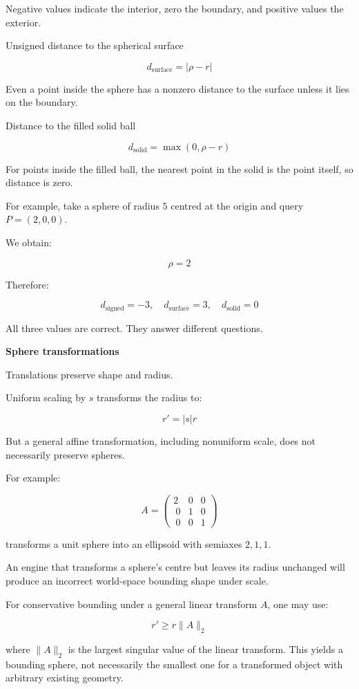 Negative values indicate the interior, zero the boundary, and positive values the exterior.

Unsigned distance to the spherical surface

\[
\boxed{d_{\mathrm{surface}}=|\rho-r|}
\]

Even a point inside the sphere has a nonzero distance to the surface unless it lies on the boundary.

Distance to the filled solid ball

\[
\boxed{d_{\mathrm{solid}}=\max(0,\rho-r)}
\]

For points inside the filled ball, the nearest point in the solid is the point itself, so distance is zero.

For example, take a sphere of radius \(5\) centred at the origin and query \(P=(2,0,0)\).

We obtain:

\[
\rho=2
\]

Therefore:

\[
d_{\mathrm{signed}}=-3,\quad d_{\mathrm{surface}}=3,\quad d_{\mathrm{solid}}=0
\]

All three values are correct. They answer different questions.

\textbf{Sphere transformations}

Translations preserve shape and radius.

Uniform scaling by \(s\) transforms the radius to:

\[
r'=|s|r
\]

But a general affine transformation, including nonuniform scale, does not necessarily preserve spheres.

For example:

\[
A= \begin{pmatrix} 2&0&0\\\ 0&1&0\\\ 0&0&1 \end{pmatrix}
\]

transforms a unit sphere into an ellipsoid with semiaxes \(2,1,1\).

An engine that transforms a sphere's centre but leaves its radius unchanged will produce an incorrect world-space bounding shape under scale.

For conservative bounding under a general linear transform \(A\), one may use:

\[
r'\ge r\|A\|_2
\]

where \(\|A\|_2\) is the largest singular value of the linear transform. This yields a bounding sphere, not necessarily the smallest one for a transformed object with arbitrary existing geometry.

